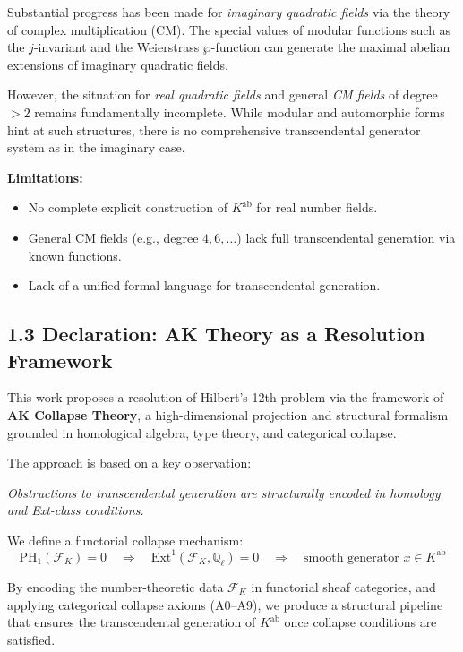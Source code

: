 \documentclass[11pt]{article}
\begin{document}
Substantial progress has been made for \textit{imaginary quadratic fields} via the theory of complex multiplication (CM).  
The special values of modular functions such as the \( j \)-invariant and the Weierstrass \( \wp \)-function can generate the maximal abelian extensions of imaginary quadratic fields.

However, the situation for \textit{real quadratic fields} and general \textit{CM fields} of degree \( > 2 \) remains fundamentally incomplete.  
While modular and automorphic forms hint at such structures, there is no comprehensive transcendental generator system as in the imaginary case.

\textbf{Limitations:}
\begin{itemize}
    \item No complete explicit construction of \( K^{\mathrm{ab}} \) for real number fields.
    \item General CM fields (e.g., degree \( 4, 6, \ldots \)) lack full transcendental generation via known functions.
    \item Lack of a unified formal language for transcendental generation.
\end{itemize}

\subsection{1.3 Declaration: AK Theory as a Resolution Framework}

This work proposes a resolution of Hilbert's 12th problem via the framework of \textbf{AK Collapse Theory}, a high-dimensional projection and structural formalism grounded in homological algebra, type theory, and categorical collapse.

The approach is based on a key observation:

\begin{center}
\textit{Obstructions to transcendental generation are structurally encoded in homology and Ext-class conditions.}
\end{center}

We define a functorial collapse mechanism:
\[
\mathrm{PH}_1(\mathcal{F}_K) = 0 \quad \Rightarrow \quad \mathrm{Ext}^1(\mathcal{F}_K, \mathbb{Q}_\ell) = 0 \quad \Rightarrow \quad \text{smooth generator } x \in K^{\mathrm{ab}}
\]

By encoding the number-theoretic data \( \mathcal{F}_K \) in functorial sheaf categories, and applying categorical collapse axioms (A0–A9), we produce a structural pipeline that ensures the transcendental generation of \( K^{\mathrm{ab}} \) once collapse conditions are satisfied.
\end{document}
